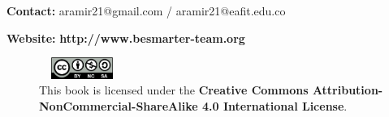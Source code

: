 \textbf{Contact:} aramir21@gmail.com / aramir21@eafit.edu.co

\textbf{Website:} \textbf{http://www.besmarter-team.org}\\

\begin{figure}[h]
	\includegraphics[width=80pt, height=20pt]{frontmatter/figures/by-nc-sa.png}
	\caption[List of figure caption goes here]{This book is licensed under the \textbf{Creative Commons Attribution-NonCommercial-ShareAlike 4.0 International License}.}\label{fig02}
\end{figure}




